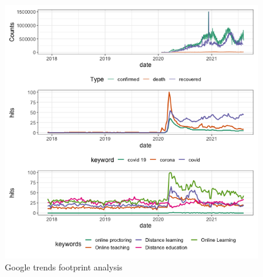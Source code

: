 \documentclass[11pt,a4paper,]{article}
\begin{document}
\begin{figure}[h]

{\centering \includegraphics[width=1\textwidth]{figure/distanceLearningWorldAnalysis-1} 

}

\caption{Google trends footprint analysis}\label{fig:distanceLearningWorldAnalysis}
\end{figure}
\end{document}
